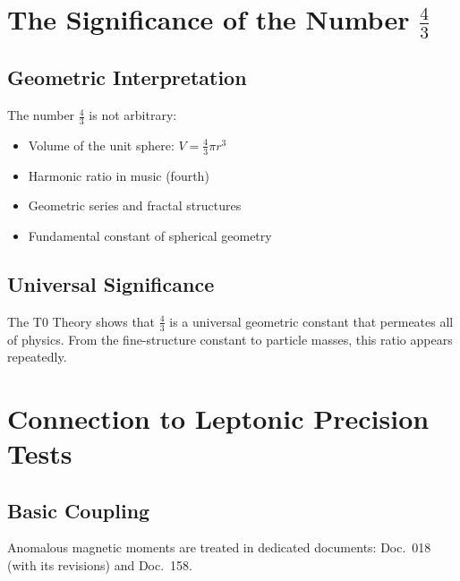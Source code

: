 	\section{The Significance of the Number $\frac{4}{3}$}
	
	\subsection{Geometric Interpretation}
	
	The number $\frac{4}{3}$ is not arbitrary:
	\begin{itemize}
		\item Volume of the unit sphere: $V = \frac{4}{3}\pi r^3$
		\item Harmonic ratio in music (fourth)
		\item Geometric series and fractal structures
		\item Fundamental constant of spherical geometry
	\end{itemize}
	
	\subsection{Universal Significance}
	
	The T0 Theory shows that $\frac{4}{3}$ is a universal geometric constant that permeates all of physics. From the fine-structure constant to particle masses, this ratio appears repeatedly.
	
	\section{Connection to Leptonic Precision Tests}
	
	\subsection{Basic Coupling}

	Anomalous magnetic moments are treated in dedicated documents: Doc.~018 (with its revisions) and Doc.~158.

